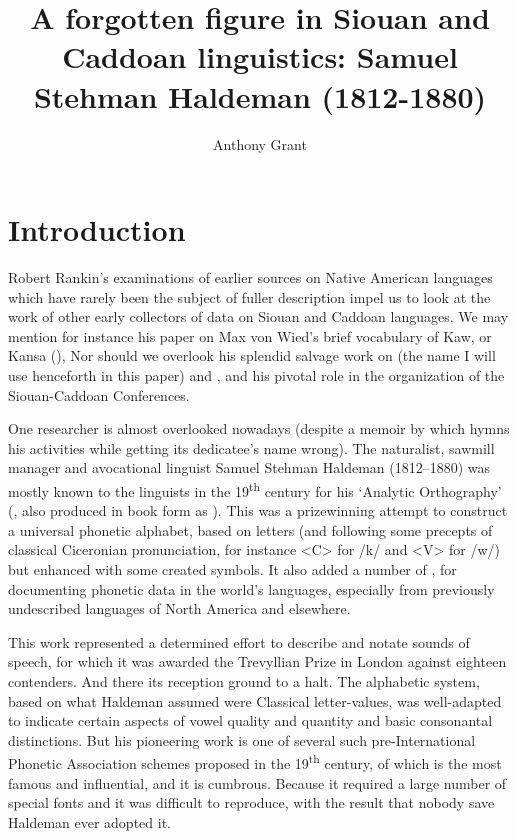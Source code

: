 \documentclass[output=paper]{LSP/langsci}
\author{Anthony Grant}
\title{A forgotten figure in {Siouan} and {Caddoan} linguistics:  {Samuel Stehman Haldeman} (1812-1880)}
\begin{document}
\section{Introduction}

 
Robert Rankin's examinations of earlier sources on Native American languages which have rarely been the subject of fuller description impel us to look at the work of other early collectors of data on Siouan and Caddoan languages. We may mention for instance his paper on Max von Wied's \citeyearpar{Maximilian18391841} brief vocabulary of Kaw,  or Kansa  (\citealt{Rankin1994}), Nor should we overlook his splendid salvage work on  (the name I will use henceforth in this paper) and , and his pivotal role in the organization of the Siouan-Caddoan Conferences.
 

One researcher is almost overlooked nowadays (despite a memoir by \citealt{Lesley1881} which hymns his activities while getting its dedicatee's name wrong). The naturalist, sawmill manager and avocational linguist Samuel Stehman Haldeman (1812--1880)  was mostly known to the linguists in the 19\textsuperscript{th} century for his `Analytic Orthography' (\citealt{Haldeman1859}, also produced in book form as \citealt{Haldeman1860}). This was a prizewinning attempt to construct a  universal phonetic alphabet, based on  letters (and following some precepts of classical Ciceronian  pronunciation, for instance <C> for /k/ and <V> for /w/) but enhanced with some created symbols. It also added a number of , for documenting phonetic data in the world's languages, especially from previously undescribed languages of North America and elsewhere.

This work represented a determined effort to describe and notate
sounds of speech, for which it was awarded the Trevyllian Prize in London against eighteen contenders. And there its reception ground to a halt. The alphabetic system, based on what Haldeman assumed were Classical  letter-values, was well-adapted to indicate certain aspects of vowel quality and quantity and basic consonantal distinctions. But his pioneering work is one of several such pre-International Phonetic Association  schemes proposed in the 19\textsuperscript{th} century, of which \citet{Lepsius1863} is the most famous and influential, and it is cumbrous.  Because it required a large number of special fonts and  it was difficult to reproduce, with the result that nobody save Haldeman ever adopted it.    
\end{document}
